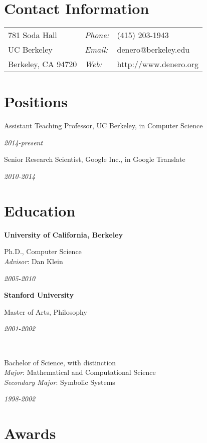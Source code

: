 \documentclass[margin,line]{res}
\newcommand{\dated}[2]{\parbox[t]{4.4in}{#1} \hspace{0.4in}
											 \parbox[t]{1in}{ {\it #2 } } }
\begin{document}

\begin{resume}

\section{\sc Contact Information}
\vspace{.05in}
\begin{tabular}{@{}p{2in}lp{4in}}
781 Soda Hall         & {\it Phone:} & (415) 203-1943        \\
UC Berkeley           & {\it Email:} & denero@berkeley.edu   \\
Berkeley, CA  94720   & {\it Web:}   & http://www.denero.org \\
\end{tabular}

\section{\sc Positions}

	\dated{Assistant Teaching Professor, UC Berkeley, in Computer Science}
	{ 2014-present }

	\dated{Senior Research Scientist, Google Inc., in Google Translate}
	{ 2010-2014 }

\section{\sc Education}

	{\bf University of California, Berkeley} \\
	\dated{Ph.D., Computer Science \\
	\hspace*{1em} {\it Advisor}: Dan Klein}{ 2005-2010 }

	{\bf Stanford University} \\
	\dated{Master of Arts, Philosophy\vspace{0.12in}}{ 2001-2002 } \\
	\dated{Bachelor of Science, with distinction \\
	\hspace*{1em} {\it Major}: Mathematical and Computational Science \\
	\hspace*{1em} {\it Secondary Major}: Symbolic Systems}{ 1998-2002 }

\section{\sc Awards}


\end{resume}
\end{document}
